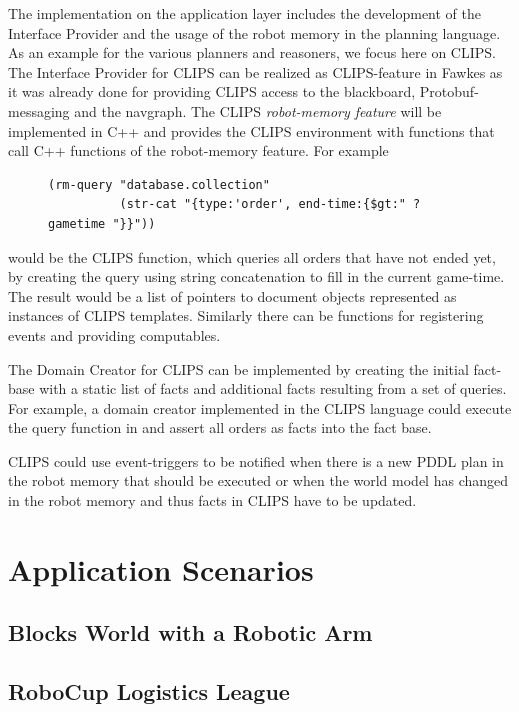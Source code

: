 The implementation on the application layer includes the development
of the Interface Provider and the usage of the robot memory in the
planning language. As an example for the various planners and
reasoners, we focus here on CLIPS. The Interface Provider for CLIPS
can be realized as CLIPS-feature in Fawkes as it was already done for
providing CLIPS access to the blackboard, Protobuf-messaging and the
navgraph. The CLIPS \emph{robot-memory feature} will be implemented in C++
and provides the CLIPS environment with functions that call C++
functions of the robot-memory feature. For example 
\begin{figure}
  \begin{lstlisting}[showlines,style=ReallySmallCLIPS, caption={CLIPS function to execute a query},
  label=lst:clips-rm,
  emph={skill, args, state, target, res},
  emphstyle=\bfseries\color{green!80!black},
  emph={[2]\?skill, \$\?args, wait-for-lock, \?target, use,
  WAIT-FOR-LOCK, SKILL-EXECUTION, running},
  emphstyle={[2]\bfseries\color{blue!80!black}},
  morekeywords={retract, assert, modify, skill-call, skill-to-execute,
    wait-for-lock}]
(rm-query "database.collection"
          (str-cat "{type:'order', end-time:{$gt:" ?gametime "}}"))
\end{lstlisting} %
\end{figure}
would be the CLIPS function, which queries all orders that have not
ended yet, by creating the query using string concatenation to fill in
the current game-time. The result would be a list of pointers to document
objects represented as instances of CLIPS templates. Similarly there
can be functions for registering events and providing computables.

The Domain Creator for CLIPS can be implemented by creating the initial
fact-base with a static list of facts and additional facts resulting
from a set of queries. For example, a domain creator implemented in
the CLIPS language could execute the query function in
 and assert all orders as facts into the fact
base.

CLIPS could use event-triggers to be notified when there is a new PDDL
plan in the robot memory that should be executed or when the world
model has changed in the robot memory and thus facts in CLIPS have to
be updated.


\section{Application Scenarios}
\label{sec:applicationscenarios}

\subsection{Blocks World with a Robotic Arm}
\label{sec:app-rcll}

\subsection{RoboCup Logistics League}
\label{sec:app-blocks-world}

\color{black}
